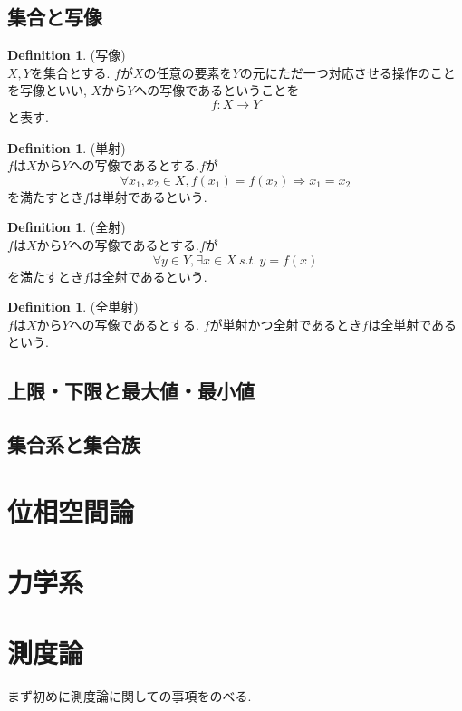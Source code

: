 \documentclass[11pt, a4paper, dvipdfmx]{jsbook}
\theoremstyle{definition}
\newtheorem{Definition+}[Axiom+]{Definition}
\begin{document}
\section{集合と写像}
\begin{Definition+}(写像)\\
  $X, Y$を集合とする.
  $f$が$X$の任意の要素を$Y$の元にただ一つ対応させる操作のことを写像といい, $X$から$Y$への写像であるということを
  \begin{equation*}
    f : X \to Y
  \end{equation*}
  と表す.
\end{Definition+}
\begin{Definition+}(単射)\\
  $f$は$X$から$Y$への写像であるとする.$f$が
  \begin{equation*}
    \forall x_{1}, x_{2}\in X, f(x_{1}) = f(x_{2}) \Longrightarrow x_{1} = x_{2}
  \end{equation*}
  を満たすとき$f$は単射であるという.
\end{Definition+}
\begin{Definition+}(全射)\\
  $f$は$X$から$Y$への写像であるとする.$f$が
  \begin{equation*}
    \forall y \in Y, \exists x\in X ~s.t.~ y = f(x)
  \end{equation*}
  を満たすとき$f$は全射であるという.
\end{Definition+}
\begin{Definition+}(全単射)\\
  $f$は$X$から$Y$への写像であるとする.
  $f$が単射かつ全射であるとき$f$は全単射であるという.
\end{Definition+}
\section{上限・下限と最大値・最小値}
\section{集合系と集合族}
\chapter{位相空間論}
\chapter{力学系}

\chapter{測度論}
まず初めに測度論に関しての事項をのべる. 
\end{document}
